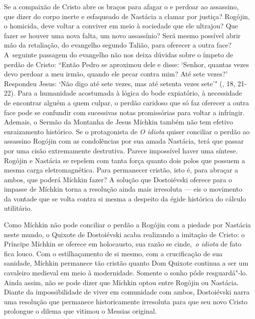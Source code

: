 Se a compaixão de Cristo abre os braços para afagar o e perdoar ao
assassino, que dizer do corpo inerte e esfaqueado de Nastácia a clamar
por justiça? Rogójin, o homicida, deve voltar a conviver em meio à
sociedade que ele ultrajou? Que fazer se houver uma nova falta, um novo
assassínio? Será mesmo possível abrir mão da retaliação, do evangelho
segundo Talião, para oferecer a outra face? A~seguinte passagem do
evangelho não nos deixa dúvidas sobre o ímpeto de perdão de Cristo:
``Então Pedro se aproximou dele e disse: `Senhor, quantas vezes devo
perdoar a meu irmão, quando ele pecar contra mim? Até sete vezes?'
Respondeu Jesus: `Não digo até sete vezes, mas até setenta vezes sete'"
(, 18, 21-22). Para a humanidade acostumada à lógica do bode
expiatório, à necessidade de encontrar alguém a quem culpar, o perdão
caridoso que só faz oferecer a outra face pode se confundir com
sucessivas notas promissórias para voltar a infringir. Ademais, o Sermão
da Montanha de Jesus Míchkin também não tem efetivo enraizamento
histórico. Se o protagonista de \emph{O idiota} quiser conciliar o
perdão ao assassino Rogójin com as condolências por sua amada Nastácia,
terá que passar por uma cisão extremamente destrutiva. Parece impossível
haver uma síntese. Rogójin e Nastácia se repelem com tanta força quanto
dois polos que possuem a mesma carga eletromagnética. Para permanecer
cristão, isto é, para abraçar a ambos, que poderá Míchkin fazer? A
solução que Dostoiévski oferece para o impasse de Míchkin torna a
resolução ainda mais irresoluta --- eis o movimento da vontade que se
volta contra si mesma a despeito da égide histórica do cálculo
utilitário.

Como Míchkin não pode conciliar o perdão a Rogójin com a piedade por
Nastácia neste mundo, o Quixote de Dostoiévski acaba realizando a
imitação de Cristo: o Príncipe Míchkin se oferece em holocausto, sua
razão se cinde,~\emph{o idiota} de fato fica louco. Com o estilhaçamento
de si mesmo, com a crucificação de sua sanidade, Míchkin permanece tão
cristão quanto Dom Quixote continua a ser um cavaleiro medieval em meio
à modernidade. Somente o sonho pôde resguardá"-lo. Ainda assim, não se
pode dizer que Míchkin optou entre Rogójin ou Nastácia. Diante da
impossibilidade de viver em comunidade com ambos, Dostoiévski narra uma
resolução que permanece historicamente irresoluta para que seu novo
Cristo prolongue o dilema que vitimou o Messias original.

